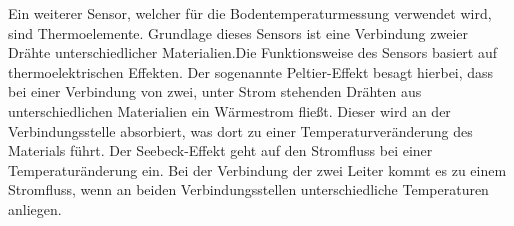 Ein weiterer Sensor, welcher für die Bodentemperaturmessung verwendet wird,
sind Thermoelemente. Grundlage dieses Sensors ist eine Verbindung zweier Drähte
unterschiedlicher Materialien.Die Funktionsweise des Sensors basiert auf
thermoelektrischen Effekten. Der sogenannte Peltier-Effekt besagt hierbei, dass
bei einer Verbindung von zwei, unter Strom stehenden Drähten aus
unterschiedlichen Materialien ein Wärmestrom fließt. Dieser wird an der
Verbindungsstelle absorbiert, was dort zu einer Temperaturveränderung des
Materials führt. Der Seebeck-Effekt geht auf den Stromfluss bei einer
Temperaturänderung ein. Bei der Verbindung der zwei Leiter kommt es zu einem
Stromfluss, wenn an beiden Verbindungsstellen unterschiedliche Temperaturen
anliegen. \cite{bernhard2014thermoelemente}


